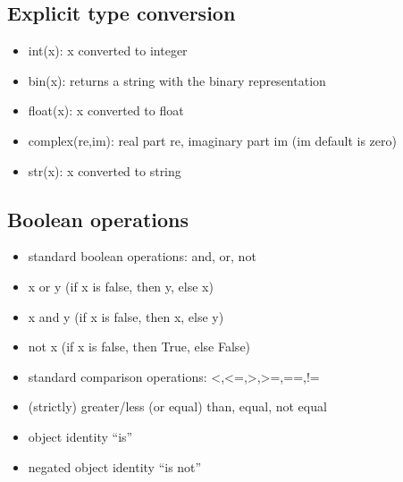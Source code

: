 \documentclass[11pt]{article}
\providecommand{\tightlist}{%
      \setlength{\itemsep}{0pt}\setlength{\parskip}{0pt}}
\begin{document}
    \hypertarget{explicit-type-conversion}{%
\subsection{Explicit type conversion}\label{explicit-type-conversion}}

\begin{itemize}
\tightlist
\item
  int(x): x converted to integer
\item
  bin(x): returns a string with the binary representation
\item
  float(x): x converted to float
\item
  complex(re,im): real part re, imaginary part im (im default is zero)
\item
  str(x): x converted to string
\end{itemize}

    \hypertarget{boolean-operations}{%
\subsection{Boolean operations}\label{boolean-operations}}

\begin{itemize}
\tightlist
\item
  standard boolean operations: and, or, not
\item
  x or y (if x is false, then y, else x)
\item
  x and y (if x is false, then x, else y)
\item
  not x (if x is false, then True, else False)
\item
  standard comparison operations:
  \textless,\textless=,\textgreater,\textgreater=,==,!=
\item
  (strictly) greater/less (or equal) than, equal, not equal
\item
  object identity ``is''
\item
  negated object identity ``is not''
\end{itemize}
\end{document}
